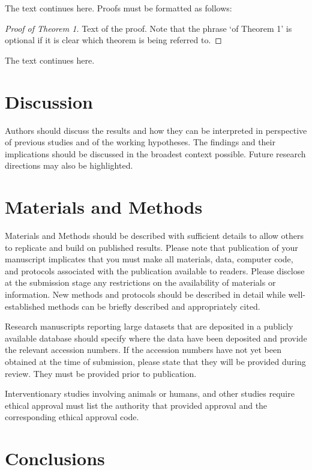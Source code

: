 \documentclass[journal,article,accept,oneauthors,pdftex,10pt,a4paper]{mdpi}
\begin{document}
The text continues here. Proofs must be formatted as follows:

\begin{proof}[Proof of Theorem 1]
Text of the proof. Note that the phrase `of Theorem 1' is optional if it is clear which theorem is being referred to.
\end{proof}
The text continues here.

\section{Discussion}

Authors should discuss the results and how they can be interpreted in perspective of previous studies and of the working hypotheses. The findings and their implications should be discussed in the broadest context possible. Future research directions may also be highlighted.

\section{Materials and Methods}

Materials and Methods should be described with sufficient details to allow others to replicate and build on published results. Please note that publication of your manuscript implicates that you must make all materials, data, computer code, and protocols associated with the publication available to readers. Please disclose at the submission stage any restrictions on the availability of materials or information. New methods and protocols should be described in detail while well-established methods can be briefly described and appropriately cited.

Research manuscripts reporting large datasets that are deposited in a publicly available database should specify where the data have been deposited and provide the relevant accession numbers. If the accession numbers have not yet been obtained at the time of submission, please state that they will be provided during review. They must be provided prior to publication.

Interventionary studies involving animals or humans, and other studies require ethical approval must list the authority that provided approval and the corresponding ethical approval code. 

\section{Conclusions}
\end{document}
